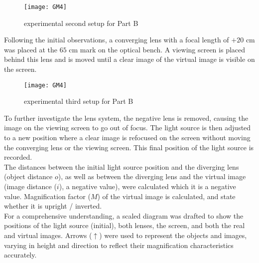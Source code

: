 \documentclass[a4paper,11pt]{article}
\begin{document}
\begin{figure}[htbp]
\centering
\texttt{[image: GM4]}
\caption{experimental second setup for Part B}
\label{6}
\end{figure}
Following the initial observations, a converging lens with a focal length of $+20$ cm was placed at the $65$ cm mark on the optical bench. A viewing screen is placed behind this lens and is moved until a clear image of the virtual image is visible on the screen. \\

\begin{figure}[htbp]
\centering
\texttt{[image: GM4]}
\caption{experimental third setup for Part B}
\label{6}
\end{figure}
To further investigate the lens system, the negative lens is removed, causing the image on the viewing screen to go out of focus. The light source is then adjusted to a new position where a clear image is refocused on the screen without moving the converging lens or the viewing screen. This final position of the light source is recorded.\\

The distances between the initial light source position and the diverging lens (object distance $o$), as well as between the diverging lens and the virtual image (image distance ($i$), a negative value), were calculated which it is a negative value. Magnification factor ($M$) of the virtual image is calculated, and state whether it is upright / inverted.\\

For a comprehensive understanding, a scaled diagram was drafted to show the positions of the light source (initial), both lenses, the screen, and both the real and virtual images. Arrows ($\uparrow$) were used to represent the objects and images, varying in height and direction to reflect their magnification characteristics accurately.\\
\end{document}
